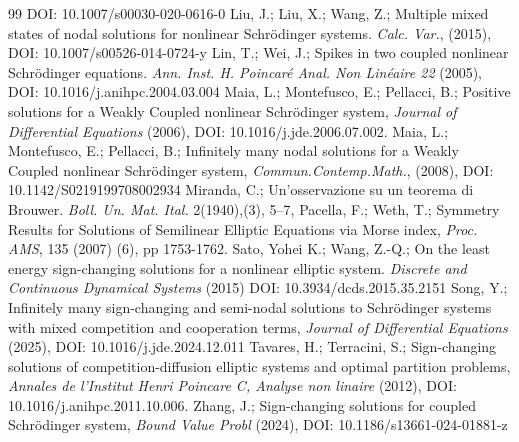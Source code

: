 \documentclass[10pt,a4paper]{amsart}
\numberwithin{equation}{section}
\begin{document}
\begin{thebibliography}{99}
DOI: 10.1007/s00030-020-0616-0
 Liu, J.; Liu, X.; Wang, Z.;
Multiple mixed states of nodal solutions for nonlinear Schr\"{o}dinger systems.
\emph{Calc. Var.}, (2015), DOI: 10.1007/s00526-014-0724-y
 Lin, T.; Wei, J.;
Spikes in two coupled nonlinear Schr\"{o}dinger equations.
\emph{Ann. Inst. H.   Poincar\'e Anal. Non Lin\'eaire 22} (2005),
  DOI: 10.1016/j.anihpc.2004.03.004
 Maia, L.; Montefusco, E.; Pellacci, B.;
Positive solutions for a Weakly Coupled nonlinear Schr\"odinger system,
\emph{Journal of Differential Equations} (2006),
DOI: 10.1016/j.jde.2006.07.002.
 Maia, L.; Montefusco, E.; Pellacci, B.;
Infinitely many nodal solutions for a Weakly Coupled nonlinear Schr\"odinger system,
\emph{Commun.Contemp.Math.}, (2008),  DOI: 10.1142/S0219199708002934
 Miranda, C.;
Un'osservazione su un teorema di Brouwer.
\emph{Boll. Un. Mat. Ital.} 2(1940),(3), 5--7,
 Pacella, F.;  Weth, T.;
Symmetry Results for Solutions of Semilinear Elliptic
Equations via Morse index, \emph{Proc. AMS}, 135 (2007) (6), pp 1753-1762.
 Sato, Yohei K.;   Wang, Z.-Q.;
On the least energy sign-changing solutions for a nonlinear elliptic system.
\emph{Discrete and Continuous Dynamical Systems} (2015)
DOI: 10.3934/dcds.2015.35.2151
 Song, Y.;
Infinitely many sign-changing and semi-nodal solutions to Schr\"{o}dinger systems
with mixed competition and cooperation terms,
\emph{Journal of Differential Equations} (2025), DOI: 10.1016/j.jde.2024.12.011
 Tavares, H.; Terracini, S.;
Sign-changing solutions of competition-diffusion elliptic systems and optimal
partition problems,
\emph{Annales de l'Institut Henri Poincare C, Analyse non linaire} (2012),
 DOI: 10.1016/j.anihpc.2011.10.006.
 Zhang, J.;
Sign-changing solutions for coupled Schr\"odinger system,
\emph{Bound Value Probl} (2024), DOI: 10.1186/s13661-024-01881-z
\end{thebibliography}
\end{document}
